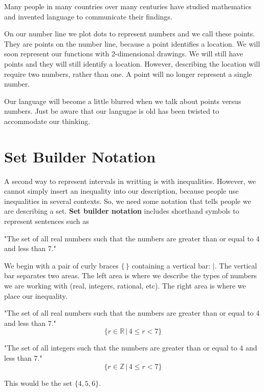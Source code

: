\documentclass{ximera}
\begin{document}
\begin{warning}
Many people in many countries over many centuries have studied mathematics and invented language to communicate their findings.

On our number line we plot dots to represent numbers and we call these points.  They are points on the number line, because a point identifies a location.  We will soon represent our functions with 2-dimensional drawings. We will still have points and they will still identify a location.  However, describing the location will require two numbers, rather than one.  A point will no longer represent a single number.

Our language will become a little blurred when we talk about points versus numbers.  Just be aware that our langugae is old has been twisted to accommodate our thinking.
\end{warning}


\section{Set Builder Notation}

A second way to represent intervals in writting is with inequalities. However, we cannot simply insert an inequality into our description, because people use inequalities in several contexts.  So, we need some notation that tells people we are describing a set. \textbf{Set builder notation} includes shorthand symbols to represent sentences such as 

"The set of all real numbers such that the numbers are greater than or equal to 4 and less than 7."

We begin with a pair of curly braces $\{  \, \}$ containing a vertical bar:  ${|}$.  The vertical bar separates two areas. The left area is where we describe the types of numbers we are working with (real, integers, rational, etc).  The right area is where we place our inequality.

\begin{example}
"The set of all real numbers such that the numbers are greater than or equal to 4 and less than 7."
\[ \{ r \in \mathbb {R} \, | \, 4 \leq r < 7 \} \]
\end{example}



\begin{example}
"The set of all integers such that the numbers are greater than or equal to 4 and less than 7."
\[ \{ r \in \mathbb {Z} \, | \, 4 \leq r < 7 \} \]

This would be the set $\{ 4, 5, 6 \}$.
\end{example}
\end{document}
